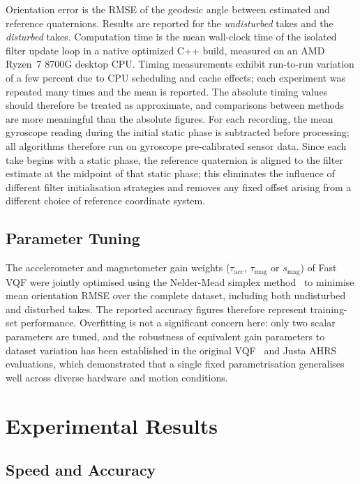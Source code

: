 \documentclass[conference]{IEEEtran}
\begin{document}
Orientation error is the RMSE of the geodesic angle between estimated and reference quaternions. Results are reported 
for the \emph{undisturbed} takes and the \emph{disturbed} takes. Computation time is the mean wall-clock time of the isolated 
filter update loop in a native optimized C++ build, measured on an AMD Ryzen~7 8700G desktop CPU. Timing measurements 
exhibit run-to-run variation of a few percent due to CPU scheduling and cache effects; each experiment was repeated 
many times and the mean is reported. The absolute timing values should therefore be treated as approximate, 
and comparisons between methods are more meaningful than the absolute figures. For each recording, the mean 
gyroscope reading during the initial static phase is subtracted before processing; all algorithms therefore 
run on gyroscope pre-calibrated sensor data. Since each take begins with a static phase, the reference quaternion is aligned to the filter estimate at the midpoint of that static phase; this eliminates the influence of different filter initialisation strategies and removes any fixed offset arising from a different choice of reference coordinate system.

\subsection{Parameter Tuning}

The accelerometer and magnetometer gain weights ($\tau_\text{acc}$, $\tau_\text{mag}$ or $s_\text{mag}$) of Fast VQF were jointly optimised using the Nelder-Mead simplex method~\cite{nelder1965} to minimise mean orientation RMSE over the complete dataset, including both undisturbed and disturbed takes. The reported accuracy figures therefore represent training-set performance. Overfitting is not a significant concern here: only two scalar parameters are tuned, and the robustness of equivalent gain parameters to dataset variation has been established in the original VQF~\cite{laidig2023vqf} and Justa AHRS~\cite{justa2020} evaluations, which demonstrated that a single fixed parametrisation generalises well across diverse hardware and motion conditions.

\section{Experimental Results}

\subsection{Speed and Accuracy}
\end{document}
